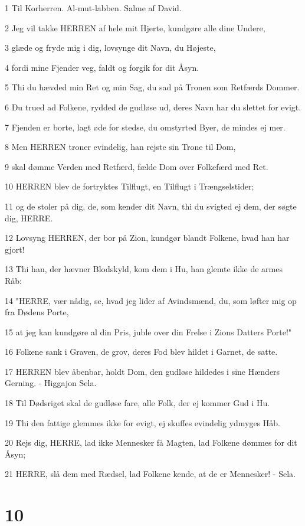 \par 1 Til Korherren. Al-mut-labben. Salme af David.
\par 2 Jeg vil takke HERREN af hele mit Hjerte, kundgøre alle dine Undere,
\par 3 glæde og fryde mig i dig, lovsynge dit Navn, du Højeste,
\par 4 fordi mine Fjender veg, faldt og forgik for dit Åsyn.
\par 5 Thi du hævded min Ret og min Sag, du sad på Tronen som Retfærds Dommer.
\par 6 Du trued ad Folkene, rydded de gudløse ud, deres Navn har du slettet for evigt.
\par 7 Fjenden er borte, lagt øde for stedse, du omstyrted Byer, de mindes ej mer.
\par 8 Men HERREN troner evindelig, han rejste sin Trone til Dom,
\par 9 skal dømme Verden med Retfærd, fælde Dom over Folkefærd med Ret.
\par 10 HERREN blev de fortryktes Tilflugt, en Tilflugt i Trængselstider;
\par 11 og de stoler på dig, de, som kender dit Navn, thi du svigted ej dem, der søgte dig, HERRE.
\par 12 Lovsyng HERREN, der bor på Zion, kundgør blandt Folkene, hvad han har gjort!
\par 13 Thi han, der hævner Blodskyld, kom dem i Hu, han glemte ikke de armes Råb:
\par 14 "HERRE, vær nådig, se, hvad jeg lider af Avindsmænd, du, som løfter mig op fra Dødens Porte,
\par 15 at jeg kan kundgøre al din Pris, juble over din Frelse i Zions Datters Porte!"
\par 16 Folkene sank i Graven, de grov, deres Fod blev hildet i Garnet, de satte.
\par 17 HERREN blev åbenbar, holdt Dom, den gudløse hildedes i sine Hænders Gerning. - Higgajon Sela.
\par 18 Til Dødsriget skal de gudløse fare, alle Folk, der ej kommer Gud i Hu.
\par 19 Thi den fattige glemmes ikke for evigt, ej skuffes evindelig ydmyges Håb.
\par 20 Rejs dig, HERRE, lad ikke Mennesker få Magten, lad Folkene dømmes for dit Åsyn;
\par 21 HERRE, slå dem med Rædsel, lad Folkene kende, at de er Mennesker! - Sela.

\chapter{10}

